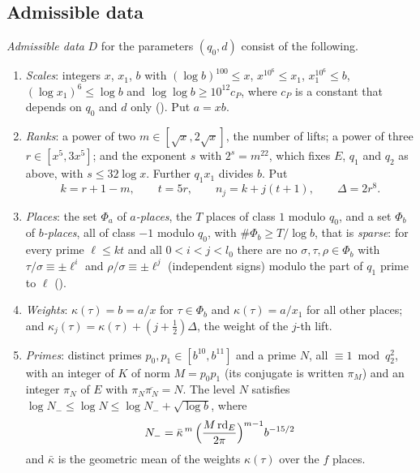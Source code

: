 \subsection{Admissible data}

\begin{definition}\label{setup:def:data}
\emph{Admissible data} $D$ for the parameters $(q_0, d)$ consist of the following.
\begin{enumerate}[label=(\alph*)]
\item \emph{Scales}: integers $x$, $x_1$, $b$ with
  $(\log b)^{100} \le x$, $x^{10^6} \le x_1$, $x_1^{10^6} \le b$, $(\log x_1)^6 \le \log b$ and
  $\log\log b \ge 10^{12} c_P$, where $c_P$ is a constant that depends on $q_0$ and $d$ only
  (). Put $a = x b$.
\item \emph{Ranks}: a power of two $m \in [\sqrt{x}, 2\sqrt{x}]$, the number of lifts; a power of
  three $r \in [x^5, 3x^5]$; and the exponent $s$ with $2^s = m^{22}$, which fixes $E$, $q_1$ and
  $q_2$ as above, with $s \le 32 \log x$. Further $q_1 x_1$ divides $b$. Put
  \[
    k = r + 1 - m, \qquad t = 5r, \qquad n_j = k + j(t+1), \qquad \Delta = 2r^8 .
  \]
\item \emph{Places}: the set $\Phi_a$ of \emph{$a$-places}, the $T$ places of class $1$ modulo
  $q_0$, and a set $\Phi_b$ of \emph{$b$-places}, all of class $-1$ modulo $q_0$, with
  $\#\Phi_b \ge T/\log b$, that is \emph{sparse}: for every prime $\ell \le kt$ and all
  $0 < i < j < l_0$ there are no $\sigma, \tau, \rho \in \Phi_b$ with
  $\tau/\sigma \equiv \pm\ell^i$ and $\rho/\sigma \equiv \pm\ell^j$ (independent signs) modulo the
  part of $q_1$ prime to $\ell$ ().
\item \emph{Weights}: $\kappa(\tau) = b = a/x$ for $\tau \in \Phi_b$ and $\kappa(\tau) = a/x_1$
  for all other places; and $\kappa_j(\tau) = \kappa(\tau) + (j + \tfrac12)\Delta$, the weight of
  the $j$-th lift.
\item \emph{Primes}: distinct primes $p_0, p_1 \in [b^{10}, b^{11}]$ and a prime $N$, all
  $\equiv 1 \bmod q_2^2$, with an integer of $K$ of norm $M = p_0 p_1$ (its conjugate is written
  $\pi_M$) and an integer $\pi_N$ of $E$ with $\pi_N \overline{\pi_N} = N$. The level $N$ satisfies
  $\log N_- \le \log N \le \log N_- + \sqrt{\log b}$, where
  \[
    N_- = \bar\kappa^{\,m}\, \Bigl( \frac{M\,\mathrm{rd}_E}{2\pi} \Bigr)^{m-1} b^{-15/2}
  \]
  and $\bar\kappa$ is the geometric mean of the weights $\kappa(\tau)$ over the $f$ places.
\end{enumerate}
\end{definition}

